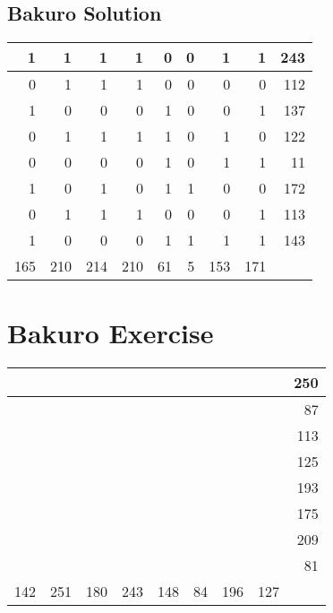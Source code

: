 \documentclass[]{article}
\begin{document}
 \subsection{Bakuro Solution} 
\begin{tabular}{rrrrrrrrr}
\hline
   1 &   1 &   1 &   1 &  0 & 0 &   1 &   1 & 243 \\ \hline
   0 &   1 &   1 &   1 &  0 & 0 &   0 &   0 & 112 \\ \hline
   1 &   0 &   0 &   0 &  1 & 0 &   0 &   1 & 137 \\ \hline
   0 &   1 &   1 &   1 &  1 & 0 &   1 &   0 & 122 \\ \hline
   0 &   0 &   0 &   0 &  1 & 0 &   1 &   1 &  11 \\ \hline
   1 &   0 &   1 &   0 &  1 & 1 &   0 &   0 & 172 \\ \hline
   0 &   1 &   1 &   1 &  0 & 0 &   0 &   1 & 113 \\ \hline
   1 &   0 &   0 &   0 &  1 & 1 &   1 &   1 & 143 \\ \hline
 165 & 210 & 214 & 210 & 61 & 5 & 153 & 171 &     \\ \hline
\hline
\end{tabular}\newpage\section{Bakuro Exercise}\begin{tabular}{rrrrrrrrr}
\hline
     &     &     &     &     &    &     &     & 250 \\ \hline
     &     &     &     &     &    &     &     &  87 \\ \hline
     &     &     &     &     &    &     &     & 113 \\ \hline
     &     &     &     &     &    &     &     & 125 \\ \hline
     &     &     &     &     &    &     &     & 193 \\ \hline
     &     &     &     &     &    &     &     & 175 \\ \hline
     &     &     &     &     &    &     &     & 209 \\ \hline
     &     &     &     &     &    &     &     &  81 \\ \hline
 142 & 251 & 180 & 243 & 148 & 84 & 196 & 127 &     \\ \hline
\hline
\end{tabular}\newpage 
\end{document}

